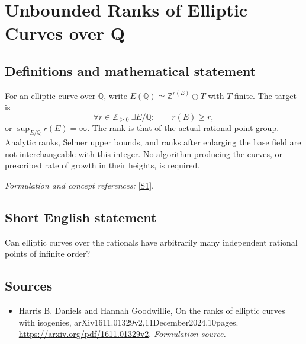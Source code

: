 \documentclass[11pt]{article}
\begin{document}
\section*{\texorpdfstring{Unbounded Ranks of Elliptic Curves over Q}{Unbounded Ranks of Elliptic Curves over Q}}\label{30006731}
\subsection{Definitions and mathematical statement}
For an elliptic curve over ${\mathbb{Q}}$, write $E({\mathbb{Q}})\simeq{\mathbb{Z}}^{r(E)}\oplus T$ with $T$ finite. The target is
\[
 \forall r\in{\mathbb{Z}}_{\ge0}\ \exists E/{\mathbb{Q}}:\qquad r(E)\ge r,
\]
or $\sup_{E/{\mathbb{Q}}}r(E)=\infty$. The rank is that of the actual rational-point group. Analytic ranks, Selmer upper bounds, and ranks after enlarging the base field are not interchangeable with this integer. No algorithm producing the curves, or prescribed rate of growth in their heights, is required.
\par\smallskip\textit{Formulation and concept references:} \href{https://arxiv.org/pdf/1611.01329v2}{[S1]}.

\subsection{Short English statement}
Can elliptic curves over the rationals have arbitrarily many independent rational points of infinite order?
\subsection{Sources}
\begin{itemize}
\item[S1]Harris B. Daniels and Hannah Goodwillie, On the ranks of elliptic curves with isogenies, arXiv1611.01329v2,11December2024,10pages.
\url{https://arxiv.org/pdf/1611.01329v2}.
\textit{Formulation source.}
\end{itemize}
\end{document}
